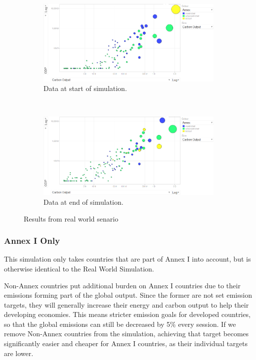 \begin{figure}[H]
		\centering
        \begin{subfigure}[b]{\textwidth}
                \centering
                \includegraphics[width=\textwidth]{img/simulations/main-before.png}
				\caption{Data at start of simulation.}
				\label{subfig:main-1}
        \end{subfigure}
        \\
        \begin{subfigure}[b]{\textwidth}
                \centering
                \includegraphics[width=\textwidth]{img/simulations/main-after.png}
				\caption{Data at end of simulation.}
				\label{subfig:main-2}
        \end{subfigure}
        \caption{Results from real world senario}\label{fig:main}
\end{figure}

\subsubsection{Annex I Only}

This simulation only takes countries that are part of Annex I into account, but is otherwise identical to the Real World Simulation.

Non-Annex countries put additional burden on Annex I countries due to their emissions forming part of the global output. Since the former are not set emission targets, they will generally increase their energy and carbon output to help their developing economies. This means stricter emission goals for developed countries, so that the global emissions can still be decreased by 5\% every session. If we remove Non-Annex countries from the simulation, achieving that target becomes significantly easier and cheaper for Annex I countries, as their individual targets are lower.

